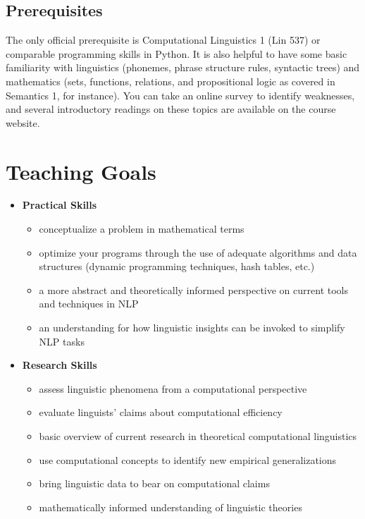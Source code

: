 \subsection{Prerequisites}

The only official prerequisite is Computational Linguistics 1 (Lin 537) or comparable programming skills in Python.
It is also helpful to have some basic familiarity with linguistics (phonemes, phrase structure rules, syntactic trees) and mathematics (sets, functions, relations, and propositional logic as covered in Semantics 1, for instance).
You can take an online survey to identify weaknesses, and several introductory readings on these topics are available on the course website.

\section{Teaching Goals}
\begin{itemize}
    \item \textbf{Practical Skills}
        \begin{itemize}
            \item conceptualize a problem in mathematical terms
            \item optimize your programs through the use of adequate algorithms and data structures (dynamic programming techniques, hash tables, etc.)
            \item a more abstract and theoretically informed perspective on current tools and techniques in NLP
            \item an understanding for how linguistic insights can be invoked to simplify NLP tasks
        \end{itemize}
    \item \textbf{Research Skills}
        \begin{itemize}
            \item assess linguistic phenomena from a computational perspective
            \item evaluate linguists' claims about computational efficiency
            \item basic overview of current research in theoretical computational linguistics
            \item use computational concepts to identify new empirical generalizations
            \item bring linguistic data to bear on computational claims
            \item mathematically informed understanding of linguistic theories
        \end{itemize}
\end{itemize}


